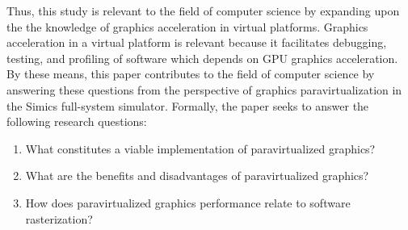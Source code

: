 Thus, this study is relevant to the field of computer science by expanding upon the the knowledge of graphics acceleration in virtual platforms.
Graphics acceleration in a virtual platform is relevant because it facilitates debugging, testing, and profiling of software which depends on GPU graphics acceleration.
By these means, this paper contributes to the field of computer science by answering these questions from the perspective of graphics paravirtualization in the Simics full-system simulator.
Formally, the paper seeks to answer the following research questions:

\begin{enumerate}
  \item What constitutes a viable implementation of paravirtualized graphics?
  \item What are the benefits and disadvantages of paravirtualized graphics?
  \item How does paravirtualized graphics performance relate to software rasterization?
\end{enumerate}
